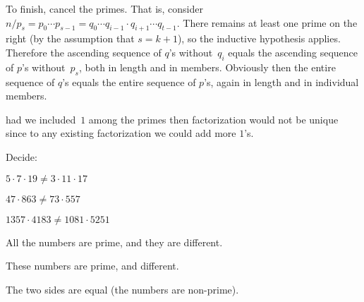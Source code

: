 \documentclass{ibl}  %
\begin{document}
\begin{ex}
\begin{ans}
\begin{exes}
To finish, cancel the primes.
That is, consider 
$n/p_s=p_0\cdots p_{s-1}=q_0\cdots q_{i-1}\cdot q_{i+1}\cdots q_{t-1}$.
There remains at least one prime on the right (by the assumption that $s=k+1$),
so the inductive hypothesis applies. 
Therefore
the ascending sequence of $q$'s without~$q_i$ 
equals the ascending sequence of $p$'s without~$p_s$,
both in length and in members. 
Obviously then the entire sequence of $q$'s equals the entire sequence of
$p$'s, again in length and in individual members. 
\end{exes}
\end{ans}
\end{ex}

\noindent\remark had we included~$1$ among the primes then 
factorization would not be unique 
since to any existing factorization we could add more $1$'s.

\begin{ex} Decide:
\begin{items}
\item $5\cdot 7\cdot 19\neq 3\cdot 11\cdot 17$
\item $47\cdot 863\neq 73\cdot 557$
\item $1357\cdot 4183\neq 1081\cdot 5251$ %
\end{items}
\begin{ans}
\begin{items}
\item All the numbers are prime, and they are different.
\item These numbers are prime, and different.
\item The two sides are equal (the numbers are non-prime).     
\end{items}
\end{ans}
\end{ex}

\end{document}
